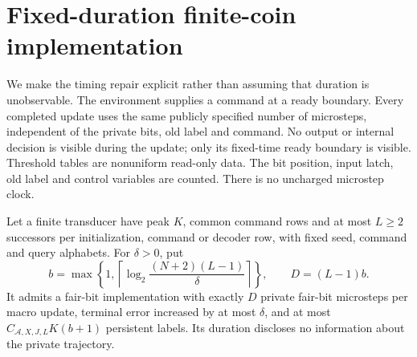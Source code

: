 \section{Fixed-duration finite-coin implementation}\label{sec:coins}
We make the timing repair explicit rather than assuming that duration is
unobservable. The environment supplies a command at a ready boundary.
Every completed update uses the same publicly specified number of
microsteps, independent of the private bits, old label and command.
No output or internal decision is visible during the update; only its
fixed-time ready boundary is visible. Threshold tables are nonuniform
read-only data. The bit position, input latch, old label and control
variables are counted. There is no uncharged microstep clock.

\begin{theorem}\label{thm:compiler}
Let a finite transducer have peak $K$, common command rows and at most
$L\ge2$ successors per initialization, command or decoder row, with fixed
seed, command and query alphabets. For $\delta>0$, put
\[
 b=\max\left\{1,\left\lceil\log_2
              \frac{(N+2)(L-1)}\delta\right\rceil\right\},
 \qquad D=(L-1)b.
\]
It admits a fair-bit implementation with exactly $D$ private fair-bit
microsteps per macro update, terminal error increased by at most
$\delta$, and at most $C_{\mathcal A,X,J,L}K(b+1)$ persistent labels.
Its duration discloses no information about the private trajectory.
\end{theorem}
